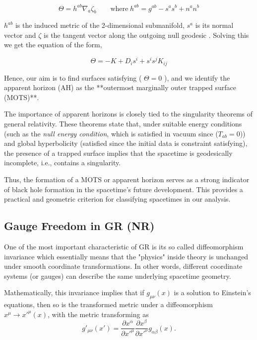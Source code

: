 \documentclass[11pt]{article}
\begin{document}
$$
\Theta = h^{ab} \nabla_a \zeta_b \qquad \text{where} \; h^{ab}= g^{ab}-s^as^b + n^a n^b 
$$

$h^{ab}$ is the induced metric of the 2-dimensional submanifold, $s^a$ is its normal vector and $\zeta$ is the tangent vector along the outgoing null geodesic . Solving this we get the equation of the form,

\begin{equation}
\Theta = -K + D_i s^i +s^is^j K_{ij} 
\label{Horizon}
\end{equation}

Hence, our aim is to find surfaces satisfying ( $\Theta = 0$ ), and we identify the apparent horizon (AH) as the **outermost marginally outer trapped surface (MOTS)**.

The importance of apparent horizons is closely tied to the singularity theorems of general relativity. These theorems state that, under suitable energy conditions (such as the \textit{null energy condition}, which is satisfied in vacuum since ($T_{ab}=0$)) and global hyperbolicity (satisfied since the initial data is constraint satisfying), the presence of a trapped surface implies that the spacetime is geodesically incomplete, i.e., contains a singularity.

Thus, the formation of a MOTS or apparent horizon serves as a strong indicator of black hole formation in the spacetime’s future development. This provides a practical and geometric criterion for classifying spacetimes in our analysis.


\subsection{Gauge Freedom in GR (NR)}

One of the most important characteristic of GR is its so called diffeomorphism invariance which essentially means
that the "physics" inside theory is unchanged under smooth coordinate transformations. In other words, different coordinate systems (or gauges) can describe the same underlying spacetime geometry.


Mathematically, this invariance implies that if $g_{\mu\nu}(x)$ is a solution to Einstein's equations, then so is the transformed metric under a diffeomorphism $x^\mu \rightarrow x'^\mu(x)$, with the metric transforming as
\begin{equation}
g'_{\mu\nu}(x') = \frac{\partial x^\alpha}{\partial x'^\mu} \frac{\partial x^\beta}{\partial x'^\nu} g_{\alpha\beta}(x).
\end{equation}
\end{document}
